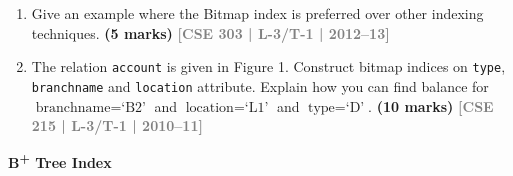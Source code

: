 \documentclass[12pt,a3paper]{article}
\newcommand{\yr}[1]{\hfill\textcolor{gray}{\small\textbf{[#1]}}}
\newcommand{\mk}[1]{\textcolor{orange!70!black}{\small\textbf{(#1 marks)}}}
\newcommand{\subtopic}[2]{%
  \vspace{10pt}
  \noindent\begin{tcolorbox}[colback=#1!8,colframe=#1,boxrule=0.6pt,arc=4pt,
    left=6pt,right=6pt,top=4pt,bottom=4pt]
    \small\bfseries\textcolor{#1}{#2}
  \end{tcolorbox}
  \vspace{2pt}
}
\begin{document}
\begin{enumerate}
\begin{center}
    \vspace{0.4cm}
    \textbf{Figure 3:} File containing records of relation \textit{employee}(\textit{emp\_id}, \textit{name}, \textit{gender}, \textit{status})
\end{center}

\mk{5} \yr{CSE 303 | L-3/T-1 | 2014--15}

\item Give an example where the Bitmap index is preferred over other indexing techniques.
\mk{5} \yr{CSE 303 | L-3/T-1 | 2012--13}

\item The relation \texttt{account} is given in Figure 1. Construct bitmap indices on \texttt{type}, \texttt{branchname} and \texttt{location} attribute. Explain how you can find balance for $\text{branchname} = \text{`B2'}$ and $\text{location} = \text{`L1'}$ and $\text{type} = \text{`D'}$.
\mk{10} \yr{CSE 215 | L-3/T-1 | 2010--11}

\end{enumerate}

\subtopic{cD}{B\textsuperscript{+} Tree Index}
\label{sub:s5-btree}
\end{document}
